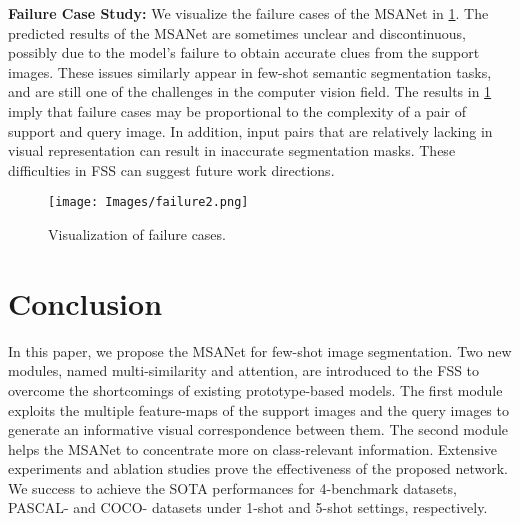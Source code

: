 \documentclass[10pt,twocolumn,letterpaper]{article}
\begin{document}
\textbf{Failure Case Study:}
We visualize the failure cases of the MSANet in \cref{fig:failure}. The predicted results of the MSANet are sometimes unclear and discontinuous, possibly due to the model's failure to obtain accurate clues from the support images. These issues similarly appear in few-shot semantic segmentation tasks, and are still one of the challenges in the computer vision field. The results in \cref{fig:failure} imply that failure cases may be proportional to the complexity of a pair of support and query image. In addition, input pairs that are relatively lacking in visual representation can result in inaccurate segmentation masks. These difficulties in FSS can suggest future work directions.

\begin{figure}
\texttt{[image: Images/failure2.png]}
\caption{Visualization of failure cases.}
\label{fig:failure}
\end{figure}
\section{Conclusion}
In this paper, we propose the MSANet for few-shot image segmentation. Two new modules, named multi-similarity and attention, are introduced to the FSS to overcome the shortcomings of existing prototype-based models. The first module exploits the multiple feature-maps of the support images and the query images to generate an informative visual correspondence between them. The second module helps the MSANet to concentrate more on class-relevant information. Extensive experiments and ablation studies prove the effectiveness of the proposed network. We success to achieve the SOTA performances for 4-benchmark datasets, PASCAL- and COCO- datasets under 1-shot and 5-shot settings, respectively.











































{\small


}
\end{document}

